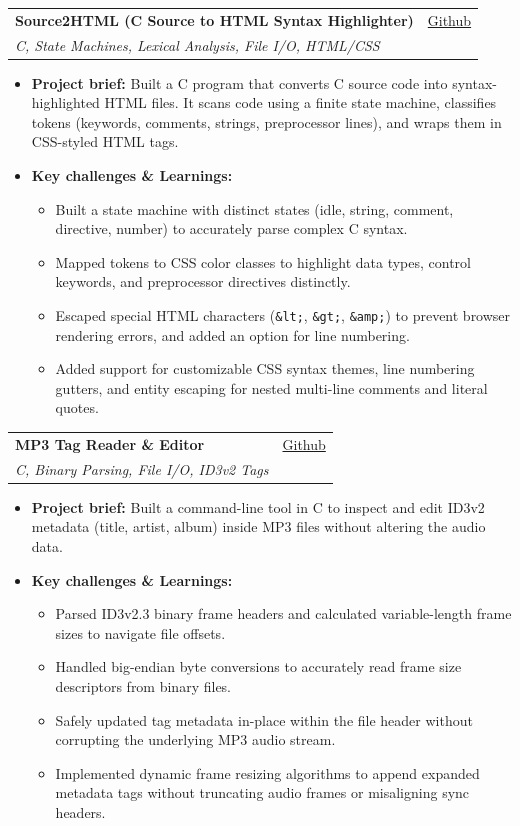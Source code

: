 \documentclass[letterpaper,11pt]{article}
\makeatletter
\newcommand{\resumeItem}[1]{
  \item
    {#1 \vspace{-3pt}}
}
\newcommand{\resumeSubheading}[4]{
  \vspace{-3pt}\item
    \begin{tabular*}{0.97\textwidth}[t]{l@{\extracolsep{\fill}}r}
      \textbf{#1} & #2 \\
      \textit{#3} & {#4} \\
    \end{tabular*}\vspace{-8pt}
}
\newcommand{\resumeItemListStart}{\begin{itemize}[topsep=1pt, itemsep=0.5pt, parsep=0pt]}
\newcommand{\resumeItemListEnd}{\end{itemize}\vspace{-6pt}}
\makeatother
\begin{document}
    \resumeSubheading
      {Source2HTML (C Source to HTML Syntax Highlighter)}{\href{https://github.com/k0-R0/Source-2-HTML}{Github}}
      {C, State Machines, Lexical Analysis, File I/O, HTML/CSS}{}
      \resumeItemListStart
        \resumeItem{\textbf{Project brief:} Built a C program that converts C source code into syntax-highlighted HTML files. It scans code using a finite state machine, classifies tokens (keywords, comments, strings, preprocessor lines), and wraps them in CSS-styled HTML tags.}
        \resumeItem{\textbf{Key challenges \& Learnings:}}
        \resumeItemListStart
            \resumeItem{Built a state machine with distinct states (idle, string, comment, directive, number) to accurately parse complex C syntax.}
            \resumeItem{Mapped tokens to CSS color classes to highlight data types, control keywords, and preprocessor directives distinctly.}
            \resumeItem{Escaped special HTML characters (\texttt{\&lt;}, \texttt{\&gt;}, \texttt{\&amp;}) to prevent browser rendering errors, and added an option for line numbering.}
            \resumeItem{Added support for customizable CSS syntax themes, line numbering gutters, and entity escaping for nested multi-line comments and literal quotes.}
        \resumeItemListEnd
      \resumeItemListEnd

    \resumeSubheading
      {MP3 Tag Reader \& Editor}{\href{https://github.com/k0-R0/MP3_TagReader}{Github}}
      {C, Binary Parsing, File I/O, ID3v2 Tags}{}
      \resumeItemListStart
        \resumeItem{\textbf{Project brief:} Built a command-line tool in C to inspect and edit ID3v2 metadata (title, artist, album) inside MP3 files without altering the audio data.}
        \resumeItem{\textbf{Key challenges \& Learnings:}}
        \resumeItemListStart
            \resumeItem{Parsed ID3v2.3 binary frame headers and calculated variable-length frame sizes to navigate file offsets.}
            \resumeItem{Handled big-endian byte conversions to accurately read frame size descriptors from binary files.}
            \resumeItem{Safely updated tag metadata in-place within the file header without corrupting the underlying MP3 audio stream.}
            \resumeItem{Implemented dynamic frame resizing algorithms to append expanded metadata tags without truncating audio frames or misaligning sync headers.}
        \resumeItemListEnd
      \resumeItemListEnd

  \newpage
\end{document}
